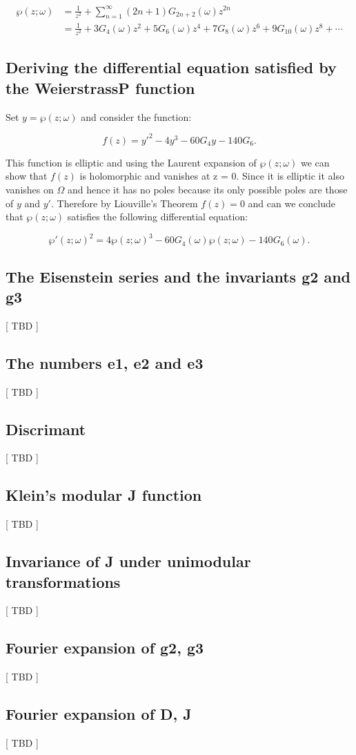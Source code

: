 \begin{align*}
    \wp(z; \omega) &= \frac{1}{z^2} + \sum_{n=1}^{\infty} (2n+1) G_{2n+2}(\omega) z^{2n} \\
    &= \frac{1}{z^2} + 3 G_4(\omega) z^2 + 5 G_6(\omega) z^4 +7 G_8(\omega) z^6 + 9 G_{10}(\omega)z^8 + \cdots
\end{align*}


\subsection{Deriving the differential equation satisfied by the WeierstrassP function}

Set $y=\wp(z; \omega)$ and consider the function:

\[
    f(z) = y'^{2} - 4y^3 - 60G_4 y - 140G_6.
\]

\noindent
This function is elliptic and using the Laurent expansion of $\wp(z;\omega)$ we can show that $f(z)$ is holomorphic
and vanishes at z = 0. Since it is elliptic it also vanishes on $\Omega$ and hence it has no poles because its only
possible poles are those of $y$ and $y'$. Therefore by Liouville's Theorem $f(z)=0$ and can we conclude that
$\wp(z; \omega)$ satisfies the following differential equation:

\[
    \wp'(z; \omega)^2 = 4 \wp(z; \omega)^3 - 60G_4(\omega)\wp(z; \omega) - 140G_6(\omega).
\]


\subsection{The Eisenstein series and the invariants g2 and g3}
[ TBD ]


\subsection{The numbers e1, e2 and e3}
[ TBD ]


\subsection{Discrimant}
[ TBD ]


\subsection{Klein's modular J function}
[ TBD ]


\subsection{Invariance of J under unimodular transformations}
[ TBD ]


\subsection{Fourier expansion of g2, g3}
[ TBD ]


\subsection{Fourier expansion of D, J}
[ TBD ]
